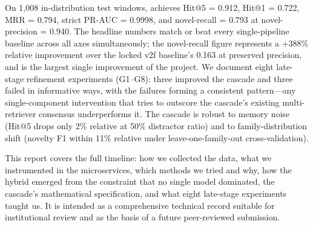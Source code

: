 On 1{,}008 in-distribution test windows, \tch{} achieves Hit@5 = 0.912, Hit@1 = 0.722, MRR = 0.794, strict PR-AUC = 0.9998, and novel-recall = 0.793 at novel-precision = 0.940. The headline numbers match or beat every single-pipeline baseline across all axes simultaneously; the novel-recall figure represents a +388\% relative improvement over the locked v2f baseline's 0.163 at preserved precision, and is the largest single improvement of the project. We document eight late-stage refinement experiments (G1--G8): three improved the cascade and three failed in informative ways, with the failures forming a consistent pattern---any single-component intervention that tries to outscore the cascade's existing multi-retriever consensus underperforms it. The cascade is robust to memory noise (Hit@5 drops only 2\% relative at 50\% distractor ratio) and to family-distribution shift (novelty F1 within 11\% relative under leave-one-family-out cross-validation).

This report covers the full timeline: how we collected the data, what we instrumented in the microservices, which methods we tried and why, how the hybrid emerged from the constraint that no single model dominated, the cascade's mathematical specification, and what eight late-stage experiments taught us. It is intended as a comprehensive technical record suitable for institutional review and as the basis of a future peer-reviewed submission.
